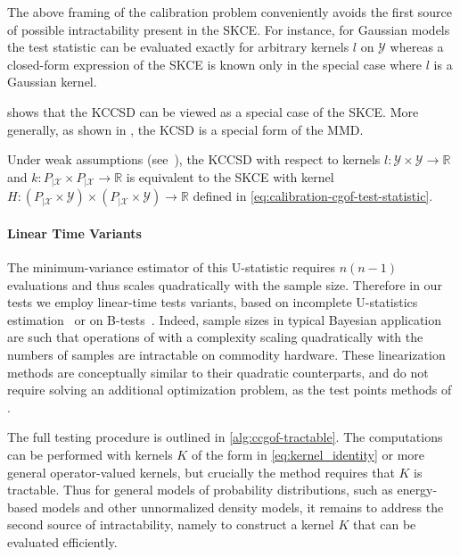 \documentclass{uai2023} %
\begin{document}
The above framing of the calibration problem conveniently avoids the first source of possible intractability present in the SKCE.
For instance, for Gaussian models the test statistic can be evaluated exactly for arbitrary kernels $l$ on $\mathcal{Y}$ whereas a closed-form expression of the SKCE is known only in the special case where $l$ is a Gaussian kernel.

 shows that the KCCSD can be viewed as a special case of the SKCE.
More generally, as shown in , the KCSD is a special form of the MMD.

\begin{proposition}\label{prop:kccsd-relation-skce}
Under weak assumptions (see~),
the KCCSD with respect to kernels $l \colon \mathcal{Y} \times \mathcal{Y} \to \mathbb{R}$ and $k \colon P_{|\mathcal{X}} \times P_{|\mathcal{X}} \to \mathbb{R}$ is equivalent to the SKCE with kernel $H \colon (P_{|\mathcal{X}} \times \mathcal{Y}) \times (P_{|\mathcal{X}} \times \mathcal{Y}) \to \mathbb{R}$ defined in \cref{eq:calibration-cgof-test-statistic}.
\end{proposition}

\paragraph{Linear Time Variants}
The minimum-variance estimator of this U-statistic requires $n(n-1)$ evaluations and thus scales quadratically with the sample size.
Therefore in our tests we employ linear-time tests variants, based on incomplete
U-statistics estimation~\cite{schrab2022efficient} or on B-tests~\cite{zaremba2013b}.
Indeed, sample sizes in typical Bayesian application are such that operations of with a complexity scaling quadratically with the numbers of samples are intractable on commodity hardware.
These linearization methods are conceptually similar to their quadratic counterparts, and do not require solving an additional optimization problem, as the test points methods of \citet{jitkrittum2020testing,jitkrittum2017linear}.


The full testing procedure is outlined in \cref{alg:ccgof-tractable}.
The computations can be performed with kernels $K$ of the form in \cref{eq:kernel_identity} or more general operator-valued kernels, but crucially the method requires that $K$ is tractable.
Thus for general models of probability distributions, such as energy-based models and other unnormalized density models, it remains to address the second source of intractability, namely to construct a kernel $K$ that can be evaluated efficiently.
\end{document}
